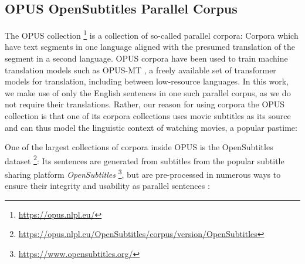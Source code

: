 \subsection{OPUS OpenSubtitles Parallel Corpus}
The OPUS collection \footnote{\url{https://opus.nlpl.eu/}} is a collection of so-called parallel corpora:
Corpora which have text segments in one language aligned with the presumed translation of the segment in a second language.
OPUS corpora have been used to train machine translation models such as OPUS-MT \cite{tiedemannOPUSMTbuildingOpenTranslation2020}, a freely available set of transformer models for translation, including between low-resource languages.
In this work, we make use of only the English sentences in one such parallel corpus, as we do not require their translations.
Rather, our reason for using corpora the OPUS collection is that one of its corpora collections uses movie subtitles as its source and can thus model the linguistic context of watching movies, a popular pastime:

One of the largest collections of corpora inside OPUS is the OpenSubtitles dataset \footnote{\url{https://opus.nlpl.eu/OpenSubtitles/corpus/version/OpenSubtitles}}:
Its sentences are generated from subtitles from the popular subtitle sharing platform \textit{OpenSubtitles} \footnote{\url{https://www.opensubtitles.org/} }, but are pre-processed in numerous ways to ensure their integrity and usability as parallel sentences \cite{lisonOpensubtitles2016ExtractingLarge2016}:

